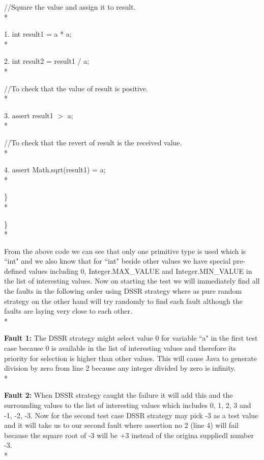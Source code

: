 \documentclass[10pt, conference, compsocconf]{IEEEtran}
\begin{document}
//Square the value and assign it to result.\\*

1.\hspace{12mm} int result1 = a * a;\\*

2. \hspace{12mm}int result2 = result1 / a;\\*

//To check that the value of result is positive.\\*

3.\hspace{12mm} assert result1 $>$ a;\\*

//To check that the revert of result is the received value.\\*

4. \hspace{12mm}assert Math.sqrt(result1) = a;\\*



\hspace{7mm}\}  \\*

\}\\*

\hspace{10 mm}From the above code we can see that only one primitive type is used which is ``int" and we also know that for ``int" beside other values we have special pre-defined values including 0, Integer.MAX\_VALUE and Integer.MIN\_VALUE in the list of interesting values. Now on starting the test we will immediately find all the faults in the following order using DSSR strategy where as pure random strategy on the other hand will try randomly to find each fault although the faults are laying very close to each other.\\*



\textbf{Fault 1:} The DSSR strategy might select value 0 for variable ``a"  in the first test case because 0 is available in the list of interesting values and therefore its priority for selection is higher than other values. This will cause Java to generate division by zero from line 2 because any integer divided by zero is infinity.\\*

\textbf{Fault 2:} When DSSR strategy caught the failure it will add this and the surrounding values to the list of interesting values which includes 0, 1, 2, 3 and -1, -2, -3. Now for the second test case DSSR strategy may pick -3 as a test value and it will take us to our second fault where assertion no 2 (line 4) will fail because the square root of -3 will be +3 instead of the origina suppliedl number -3.\\*
\end{document}
